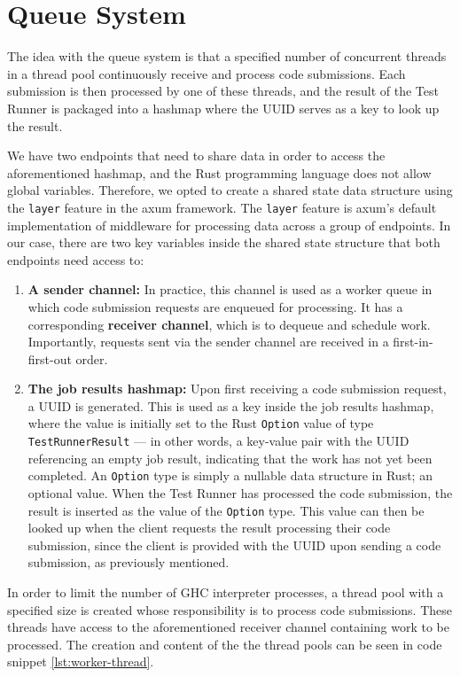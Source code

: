 \section{Queue System} \label{sec:queue-system}
The idea with the queue system is that a specified number of concurrent threads in a thread pool continuously receive and process code submissions.
Each submission is then processed by one of these threads, and the result of the Test Runner is packaged into a hashmap where the UUID serves as a key to look up the result.

We have two endpoints that need to share data in order to access the aforementioned hashmap, and the Rust programming language does not allow global variables.
Therefore, we opted to create a shared state data structure using the \texttt{layer} feature in the axum framework.
The \texttt{layer} feature is axum's default implementation of middleware for processing data across a group of endpoints.
In our case, there are two key variables inside the shared state structure that both endpoints need access to:
\begin{enumerate}
    \item \textbf{A sender channel:} In practice, this channel is used as a worker queue in which code submission requests are enqueued for processing. It has a corresponding \textbf{receiver channel}, which is to dequeue and schedule work. Importantly, requests sent via the sender channel are received in a first-in-first-out order.
    \item \textbf{The job results hashmap:} Upon first receiving a code submission request, a UUID is generated. This is used as a key inside the job results hashmap, where the value is initially set to the Rust \texttt{Option} value of type \texttt{TestRunnerResult} --- in other words, a key-value pair with the UUID referencing an empty job result, indicating that the work has not yet been completed. An \texttt{Option} type is simply a nullable data structure in Rust; an optional value. When the Test Runner has processed the code submission, the result is inserted as the value of the \texttt{Option} type. This value can then be looked up when the client requests the result processing their code submission, since the client is provided with the UUID upon sending a code submission, as previously mentioned.
\end{enumerate}

In order to limit the number of GHC interpreter processes, a thread pool with a specified size is created whose responsibility is to process code submissions.
These threads have access to the aforementioned receiver channel containing work to be processed.
The creation and content of the the thread pools can be seen in code snippet \ref{lst:worker-thread}.

